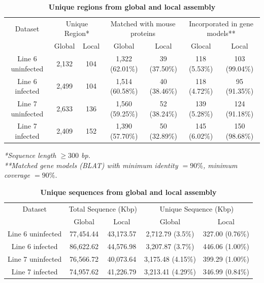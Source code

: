 \documentclass[10pt]{article}
\begin{document}
\begin{table}[!ht]
\caption{
\bf{Unique regions from global and local assembly}}
\begin{tabular}{ccccccc}
\hline
Dataset & \multicolumn{2}{c}{Unique Region*} & \multicolumn{2}{c}{Matched with mouse proteins} & \multicolumn{2}{c}{Incorporated in gene models**}\\
 & Global & Local & Global & Local & Glocal & Local\\
\hline
Line 6 uninfected & 2,132 & 104 & 1,322 (62.01\%) & 39 (37.50\%) & 118 (5.53\%) & 103 (99.04\%) \\
Line 6 infected & 2,499 & 104 & 1,514 (60.58\%)& 40 (38.46\%) & 118 (4.72\%) & 95 (91.35\%) \\
Line 7 uninfected & 2,633 & 136 & 1,560 (59.25\%) & 52 (38.24\%) & 139 (5.28\%) & 124 (91.18\%) \\
Line 7 infected & 2,409 & 152 & 1,390 (57.70\%)& 50 (32.89\%) & 145 (6.02\%) & 150 (98.68\%) \\
\hline
\end{tabular}
\label{unique_sequences_matched_mouse}
\begin{flushleft}\footnotesize \textit{*Sequence length $\ge300$ bp.\\
**Matched gene models (BLAT) with minimum identity $=90\%$,
minimum coverage $=90\%$.}
\end{flushleft}
\label{uniq_regions}
\end{table}

\begin{table}[!ht]
\caption{
\bf{Unique sequences from global and local assembly}}
\begin{tabular}{ccccc}
\hline
Dataset & \multicolumn{2}{c}{Total Sequence (Kbp)} & \multicolumn{2}{c}{Unique Sequence (Kbp)}\\
 & Global & Local & Global & Local\\
\hline
Line 6 uninfected & 77,454.44 & 43,173.57 & 2,712.79 (3.5\%) & 327.00 (0.76\%)\\
Line 6 infected & 86,622.62 & 44,576.98 & 3,207.87 (3.7\%) & 446.06 (1.00\%)\\
Line 7 uninfected & 76,566.72 & 40,073.64 & 3,175.48 (4.15\%) & 399.29 (1.00\%)\\
Line 7 infected & 74,957.62 & 41,226.79 & 3,213.41 (4.29\%) & 346.99 (0.84\%)\\
\hline
\end{tabular}
\label{unique_sequences}
\end{table}
\end{document}
